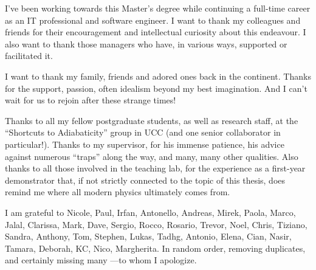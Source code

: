 I've been working towards this Master's degree 
while continuing a full-time career as an IT professional and software engineer. 
I want to thank my colleagues and friends 
for their encouragement and intellectual curiosity about this endeavour. 
I also want to thank those managers who have, 
in various ways, 
supported or facilitated it.

I want to thank my family, friends and adored ones back in the continent. 
Thanks for the support, passion, often idealism beyond my best imagination. 
And I can’t wait for us to rejoin after these strange times!

Thanks to all my fellow postgraduate students, as well as research staff, at the
“Shortcuts to Adiabaticity” group in UCC (and one senior collaborator in particular!). 
Thanks to my supervisor, for his immense patience, his advice against numerous “traps” along the way, 
and many, many other qualities. 
Also thanks to all those involved in the teaching lab, 
for the experience as a first-year demonstrator that, 
if not strictly connected to the topic of this thesis, 
does remind me where all modern physics ultimately comes from.

I am grateful to Nicole, Paul, Irfan, Antonello, Andreas, Mirek, Paola, Marco,
Jalal, Clarissa, Mark, Dave, Sergio, Rocco, Rosario, Trevor, Noel, Chris, Tiziano,
Sandra, Anthony, Tom, Stephen, Lukas, Tadhg, Antonio, Elena, Cian, Nasir, Tamara, 
Deborah, KC, Nico, Margherita. 
In random order, removing duplicates, and certainly missing many ---to whom I apologize.
